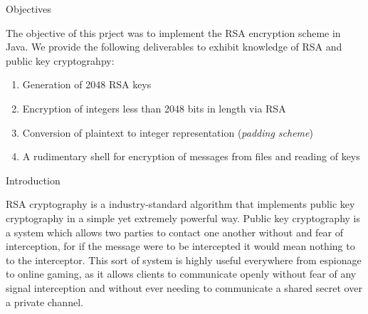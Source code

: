 \documentclass[landscape,fontscale=.4,paperwidth=48in,paperheight=36in]{baposter} %
\newcommand{\compresslist}{ %
\setlength{\itemsep}{1pt}
\setlength{\parskip}{0pt}
\setlength{\parsep}{0pt}
}
\begin{document}
\begin{poster}

\begin{posterbox}[name=objectives,column=0,row=0,span=13]{Objectives}

The objective of this prject was to implement the RSA encryption scheme in Java. We provide the following deliverables to exhibit knowledge of RSA and public key cryptograhpy:

\begin{enumerate}\compresslist
\item Generation of 2048 RSA keys
\item Encryption of integers less than 2048 bits in length via RSA
\item Conversion of plaintext to integer representation (\emph{padding scheme})
\item A rudimentary shell for encryption of messages from files and reading of keys
\end{enumerate}

\vspace{0.3em} %
\end{posterbox}


\begin{posterbox}[name=intro,column=0,below=objectives, span=13]{Introduction}

RSA cryptography is a industry-standard algorithm that implements public key cryptography in a simple yet extremely powerful way. Public key cryptography is a system which allows two parties to contact one another without and fear of interception, for if the message were to be intercepted it would mean nothing to to the interceptor. This sort of system is highly useful everywhere from espionage to online gaming, as it allows clients to communicate openly without fear of any signal interception and without ever needing to communicate a shared secret over a private channel.


\end{posterbox}
\end{poster}
\end{document}
